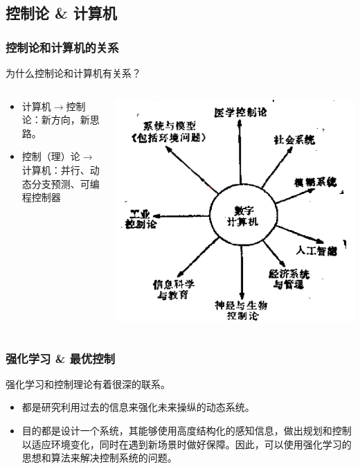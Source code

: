 \documentclass[12pt,AutoFakeBold,aspectratio=43,mathserif]{beamer}
\begin{document}
    \subsection{控制论 \& 计算机}
    \begin{frame}
        \frametitle{控制论和计算机的关系}
        \begin{block}{\textnormal{为什么控制论和计算机有关系？}} \end{block} \pause
        \begin{columns}
            \begin{column}{.5\linewidth}
                \begin{itemize}
                    \item  计算机$\to$控制论：新方向，新思路。
                    \item  控制（理）论$\to$计算机：并行、动态分支预测、可编程控制器
                \end{itemize}
            \end{column}
            \begin{column}{.5\linewidth}
                \includegraphics[width=.4\paperwidth]{figures/3-3.jpg}
            \end{column}
        \end{columns}
        
    \end{frame}
    \begin{frame}
        \frametitle{强化学习 \& 最优控制}
        强化学习和控制理论有着很深的联系。 \pause
        \begin{itemize}
            \item  都是研究利用过去的信息来强化未来操纵的动态系统。\pause
            \item  目的都是设计一个系统，其能够使用高度结构化的感知信息，做出规划和控制以适应环境变化，同时在遇到新场景时做好保障。因此，可以使用强化学习的思想和算法来解决控制系统的问题。 
        \end{itemize}
    \end{frame}
\end{document}
